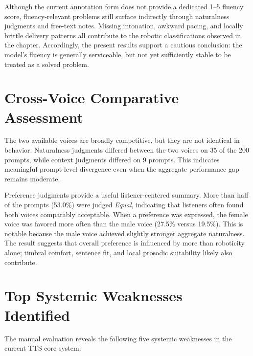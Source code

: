 Although the current annotation form does not provide a dedicated 1--5 fluency score, fluency-relevant problems still surface indirectly through naturalness judgments and free-text notes. Missing intonation, awkward pacing, and locally brittle delivery patterns all contribute to the robotic classifications observed in the chapter. Accordingly, the present results support a cautious conclusion: the model's fluency is generally serviceable, but not yet sufficiently stable to be treated as a solved problem.

\section{Cross-Voice Comparative Assessment}

The two available voices are broadly competitive, but they are not identical in behavior. Naturalness judgments differed between the two voices on 35 of the 200 prompts, while context judgments differed on 9 prompts. This indicates meaningful prompt-level divergence even when the aggregate performance gap remains moderate.

Preference judgments provide a useful listener-centered summary. More than half of the prompts (53.0\%) were judged \textit{Equal}, indicating that listeners often found both voices comparably acceptable. When a preference was expressed, the female voice was favored more often than the male voice (27.5\% versus 19.5\%). This is notable because the male voice achieved slightly stronger aggregate naturalness. The result suggests that overall preference is influenced by more than roboticity alone; timbral comfort, sentence fit, and local prosodic suitability likely also contribute.

\section{Top Systemic Weaknesses Identified}

The manual evaluation reveals the following five systemic weaknesses in the current TTS core system:

